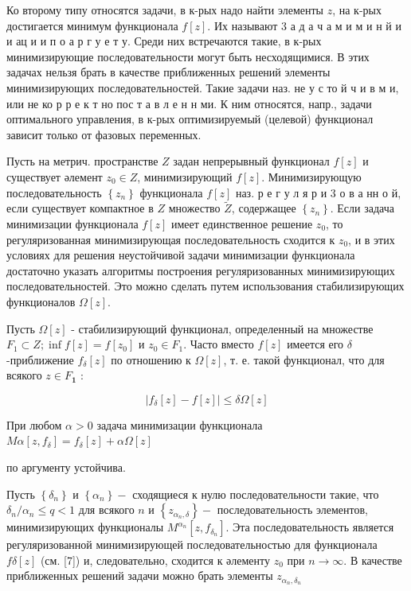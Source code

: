 \documentclass[10pt]{article}
\begin{document}
Ко второму типу относятся задачи, в к-рых надо найти элементы $z$, на к-рых достигается минимум функционала $f[z]$. Их называют 3 а д а ч а м и м и н й и и ац и и п о а р г у е т у. Среди них встречаются такие, в к-рых минимизирующие последовательности могут быть несходящимися. В этих задачах нельзя брать в качестве приближенных решений элементы минимизирующих последовательностей. Такие задачи наз. не у с то й ч и в м и, или не ко р р е к т но пос т а в л е н н ми. К ним относятся, напр., задачи оптимального управления, в к-рых оптимизируемый (целевой) функционал зависит только от фазовых переменных.



Пусть на метрич. пространстве $Z$ задан непрерывный функционал $f[z]$ и существует әлемент $z_{0} \in Z$, минимизирующий $f[z]$. Минимизирующую последовательность $\left\{z_{n}\right\}$ функционала $f[z]$ наз. р е г у л я р и 3 о в а нн о й, если существует компактное в $Z$ множество $\tilde{Z}$, содержащее $\left\{z_{n}\right\}$. Если задача минимизации функционала $f[z]$ имеет единственное решение $z_{0}$, то регуляризованная минимизирующая последовательность сходится к $z_{0}$, и в этих условиях для решения неустойчивой задачи минимизации функционала достаточно указать алгоритмы построения регуляризованных минимизирующих последовательностей. Это можно сделать путем использования стабилизирующих функционалов $\Omega[z]$.



Пусть $\Omega[z]$ - стабилизирующий функционал, определенный на множестве $F_{1} \subset Z ; \inf f[z]=f\left[z_{0}\right]$ и $z_{0} \in F_{1}$. Часто вместо $f[z]$ имеется его $\delta$-приближение $f_{\delta}[z]$ по отношению к $\Omega[z]$, т. е. такой функционал, что для всякого $z \in F_{\mathbf{1}}$ :



\[

\left|f_{\delta}[z]-f[z]\right| \leqslant \delta \Omega[z]

\]



При любом $\alpha>0$ задача минимизации функционала $M \alpha\left[z, f_{\delta}\right]=f_{\delta}[z]+\alpha \Omega[z]$



по аргументу устойчива.



Пусть $\left\{\delta_{n}\right\}$ и $\left\{\alpha_{n}\right\}-$ сходящиеся к нулю последовательности такие, что $\delta_{n} / \alpha_{n} \leqslant q<1$ для всякого $n$ и $\left\{z_{\alpha_{n}, \delta}\right\}-$ последовательность элементов, минимизирующих функционалы $M^{\alpha_{n}}\left[z, f_{\delta_{n}}\right]$. Эта последовательность является регуляризованной минимизирующей последовательностью для функционала $f \delta[z]$ (см. [7]) и, следовательно, сходится к әлементу $z_{0}$ при $n \rightarrow \infty$. В качестве приближенных решений задачи можно брать элементы $z_{\alpha_{n}, \delta_{n}}$
\end{document}
